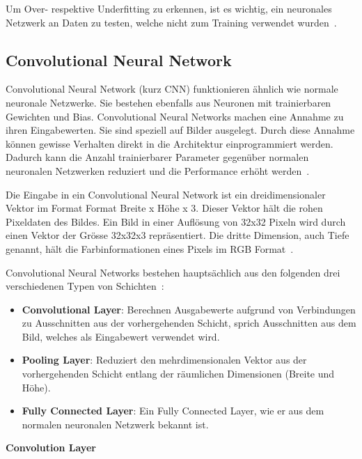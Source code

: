 Um Over- respektive Underfitting zu erkennen, ist es wichtig, ein neuronales Netzwerk an Daten zu testen, welche nicht zum Training verwendet wurden~\autocite{Krogh2008}.

\subsection{Convolutional Neural Network}
\label{chap:cnn}

Convolutional Neural Network (kurz CNN) funktionieren ähnlich wie normale neuronale Netzwerke. Sie bestehen ebenfalls aus Neuronen mit trainierbaren Gewichten und Bias. Convolutional Neural Networks machen eine Annahme zu ihren Eingabewerten. Sie sind speziell auf Bilder ausgelegt. Durch diese Annahme können gewisse Verhalten direkt in die Architektur einprogrammiert werden. Dadurch kann die Anzahl trainierbarer Parameter gegenüber normalen neuronalen Netzwerken reduziert und die Performance erhöht werden~\autocite{CNN}.

Die Eingabe in ein Convolutional Neural Network ist ein dreidimensionaler Vektor im Format Format Breite x Höhe x 3. Dieser Vektor hält die rohen Pixeldaten des Bildes. Ein Bild in einer Auflösung von 32x32 Pixeln wird durch einen Vektor der Grösse 32x32x3 repräsentiert. Die dritte Dimension, auch Tiefe genannt, hält die Farbinformationen eines Pixels im RGB Format~\autocite{CNN}.

Convolutional Neural Networks bestehen hauptsächlich aus den folgenden drei verschiedenen Typen von Schichten~\autocite{CNN}:

\begin{itemize}
    \item \textbf{Convolutional Layer}: Berechnen Ausgabewerte aufgrund von Verbindungen zu Ausschnitten aus der vorhergehenden Schicht, sprich Ausschnitten aus dem Bild, welches als Eingabewert verwendet wird.
    \item \textbf{Pooling Layer}: Reduziert den mehrdimensionalen Vektor aus der vorhergehenden Schicht entlang der räumlichen Dimensionen (Breite und Höhe).
    \item \textbf{Fully Connected Layer}: Ein Fully Connected Layer, wie er aus dem normalen neuronalen Netzwerk bekannt ist.
\end{itemize}

\textbf{Convolution Layer}

\nopagebreak

